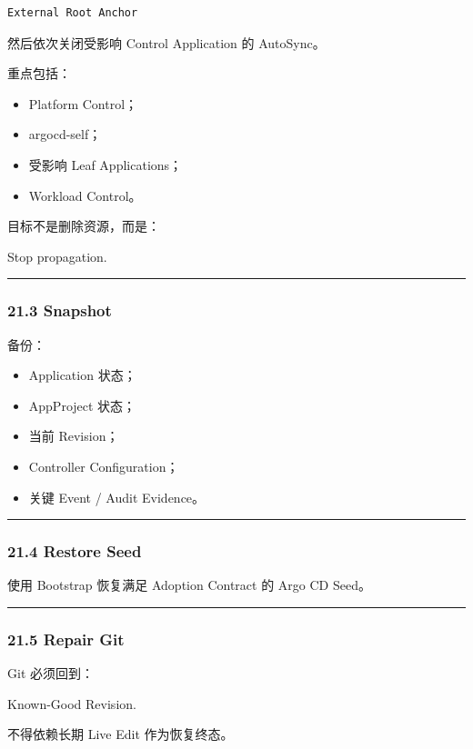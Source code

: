 \documentclass[11pt,a4paper]{article}
\begin{document}
\begin{lstlisting}[language=text]
External Root Anchor
\end{lstlisting}
然后依次关闭受影响 Control Application 的 AutoSync。

重点包括：

\begin{itemize}
  \item Platform Control；
  \item argocd-self；
  \item 受影响 Leaf Applications；
  \item Workload Control。
\end{itemize}
目标不是删除资源，而是：

\begin{gfmBlockquote}
Stop propagation.
\end{gfmBlockquote}
\vspace{0.5em}\hrule\vspace{0.5em}
\subsubsection{21.3 Snapshot}
备份：

\begin{itemize}
  \item Application 状态；
  \item AppProject 状态；
  \item 当前 Revision；
  \item Controller Configuration；
  \item 关键 Event / Audit Evidence。
\end{itemize}
\vspace{0.5em}\hrule\vspace{0.5em}
\subsubsection{21.4 Restore Seed}
使用 Bootstrap 恢复满足 Adoption Contract 的 Argo CD Seed。

\vspace{0.5em}\hrule\vspace{0.5em}
\subsubsection{21.5 Repair Git}
Git 必须回到：

\begin{gfmBlockquote}
Known-Good Revision.
\end{gfmBlockquote}
不得依赖长期 Live Edit 作为恢复终态。
\end{document}

